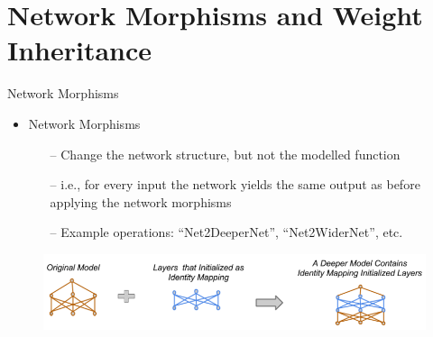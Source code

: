 \section{Network Morphisms and Weight Inheritance}


\begin{frame}{Network Morphisms}
    \begin{itemize}
    	\item \alert{Network Morphisms} 
	\begin{itemize}
		\item[--] \alert{Change the network structure, but not the modelled function}
		\item[--] i.e., for every input the network yields the same output as before applying
		the network morphisms 
		
		\item[--] Example operations: ``Net2DeeperNet'', ``Net2WiderNet'', etc.
	\end{itemize}
    \end{itemize}

    \begin{figure}[t]
        \begin{centering}
            \includegraphics[scale=0.3]{images_lec7/net2deepernet.png}
        \end{centering}
    \end{figure}

\end{frame}

